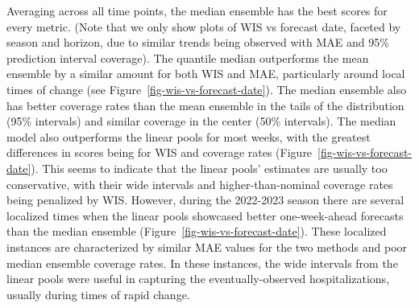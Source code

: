\documentclass[
  letterpaper,
  DIV=11,
  numbers=noendperiod]{scrartcl}
\begin{document}
Averaging across all time points, the median ensemble has the best
scores for every metric. (Note that we only show plots of WIS vs
forecast date, faceted by season and horizon, due to similar trends
being observed with MAE and 95\% prediction interval coverage). The
quantile median outperforms the mean ensemble by a similar amount for
both WIS and MAE, particularly around local times of change (see
Figure~\ref{fig-wis-vs-forecast-date}). The median ensemble also has
better coverage rates than the mean ensemble in the tails of the
distribution (95\% intervals) and similar coverage in the center (50\%
intervals). The median model also outperforms the linear pools for most
weeks, with the greatest differences in scores being for WIS and
coverage rates (Figure~\ref{fig-wis-vs-forecast-date}). This seems to
indicate that the linear pools' estimates are usually too conservative,
with their wide intervals and higher-than-nominal coverage rates being
penalized by WIS. However, during the 2022-2023 season there are several
localized times when the linear pools showcased better one-week-ahead
forecasts than the median ensemble
(Figure~\ref{fig-wis-vs-forecast-date}). These localized instances are
characterized by similar MAE values for the two methods and poor median
ensemble coverage rates. In these instances, the wide intervals from the
linear pools were useful in capturing the eventually-observed
hospitalizations, usually during times of rapid change.
\end{document}
